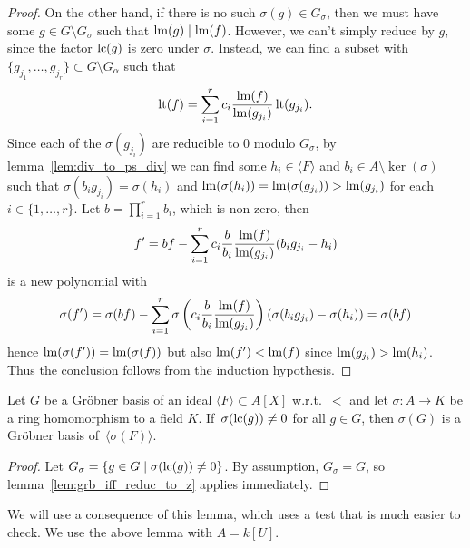 \begin{proof}
  On the other hand, if there is no such $\sigma(g) \in G_{\sigma}$, then we must have some $g \in G \setminus G_{\sigma}$ such that $\operatorname{lm}(g) \mid \operatorname{lm}(f)$. However, we can't simply reduce by $g$, since the factor $\operatorname{lc}(g)$ is zero under $\sigma$. Instead, we can find a subset with $\{g_{j_{1}}, \dots, g_{j_{r}}\} \subset G \setminus G_{\alpha}$ such that
  \[\operatorname{lt}(f) = \sum_{i = 1}^{r} c_{i} \frac{\operatorname{lm}(f)}{\operatorname{lm}(g_{j_{i}})} \operatorname{lt}(g_{j_{i}}).\]
  Since each of the $\sigma(g_{j_{i}})$ are reducible to 0 modulo $G_{\sigma}$, by lemma~\ref{lem:div_to_ps_div} we can find some $h_{i} \in \langle F \rangle$ and $b_{i} \in A \setminus \ker(\sigma)$ such that $\sigma(b_{i} g_{j_{i}}) = \sigma(h_{i})$ and $\operatorname{lm}(\sigma(h_{i})) = \operatorname{lm}(\sigma(g_{j_{i}})) > \operatorname{lm}(g_{j_{i}})$ for each $i \in \{1, \dots, r\}$. Let $b = \prod_{i = 1}^{r} b_{i}$, which is non-zero, then
  \[f' = b f - \sum_{i = 1}^{r} c_{i} \frac{b}{b_{i}} \frac{\operatorname{lm}(f)}{\operatorname{lm}(g_{j_{i}})}(b_{i}g_{j_{i}} - h_{i})\]
  is a new polynomial with
  \[\sigma(f') = \sigma(b f) - \sum_{i = 1}^{r} \sigma\left(c_{i} \frac{b}{b_{i}} \frac{\operatorname{lm}(f)}{\operatorname{lm}(g_{j_{i}})}\right) (\sigma(b_{i} g_{j_{i}}) - \sigma(h_{i})) = \sigma(b f)\]
  hence $\operatorname{lm}(\sigma(f')) = \operatorname{lm}(\sigma(f))$ but also $\operatorname{lm}(f') < \operatorname{lm}(f)$ since $\operatorname{lm}(g_{j_{i}}) > \operatorname{lm}(h_{i})$. Thus the conclusion follows from the induction hypothesis.
\end{proof}

\begin{corollary}\label{cor:grb_if_nmap_to_z}
  Let $G$ be a Gröbner basis of an ideal $\langle F \rangle \subset A[X]$ w.r.t.\ $<$ and let $\sigma : A \to K$ be a ring homomorphism to a field $K$. If $\,\sigma(\operatorname{lc}(g)) \neq 0$ for all $g \in G$, then $\sigma(G)$ is a Gröbner basis of $\,\langle \sigma(F) \rangle$.
\end{corollary}
\begin{proof}
  Let $G_{\sigma} = \{g \in G \mid \sigma(\operatorname{lc}(g)) \neq 0\}$. By assumption, $G_{\sigma} = G$, so lemma~\ref{lem:grb_iff_reduc_to_z} applies immediately.
\end{proof}


We will use a consequence of this lemma, which uses a test that is much easier to check. We use the above lemma with $A = k[U]$.

